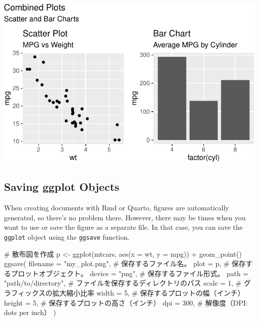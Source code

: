 \documentclass[
  a4paper,
]{book}
\newenvironment{Shaded}{\begin{snugshade}}{\end{snugshade}}
\newcommand{\AttributeTok}[1]{\textcolor[rgb]{0.40,0.45,0.13}{#1}}
\newcommand{\CommentTok}[1]{\textcolor[rgb]{0.37,0.37,0.37}{#1}}
\newcommand{\DecValTok}[1]{\textcolor[rgb]{0.68,0.00,0.00}{#1}}
\newcommand{\FunctionTok}[1]{\textcolor[rgb]{0.28,0.35,0.67}{#1}}
\newcommand{\NormalTok}[1]{\textcolor[rgb]{0.00,0.23,0.31}{#1}}
\newcommand{\OtherTok}[1]{\textcolor[rgb]{0.00,0.23,0.31}{#1}}
\newcommand{\SpecialCharTok}[1]{\textcolor[rgb]{0.37,0.37,0.37}{#1}}
\newcommand{\StringTok}[1]{\textcolor[rgb]{0.13,0.47,0.30}{#1}}
\begin{document}
\includegraphics{chapter04_files/figure-pdf/patchwork example-1.pdf}

\subsection{Saving ggplot Objects}\label{saving-ggplot-objects}

When creating documents with Rmd or Quarto, figures are automatically
generated, so there's no problem there. However, there may be times when
you want to use or save the figure as a separate file. In that case, you
can save the \texttt{ggplot} object using the \texttt{ggsave} function.

\begin{Shaded}
\begin{Highlighting}[]
\CommentTok{\# 散布図を作成}
\NormalTok{p }\OtherTok{\textless{}{-}} \FunctionTok{ggplot}\NormalTok{(mtcars, }\FunctionTok{aes}\NormalTok{(}\AttributeTok{x =}\NormalTok{ wt, }\AttributeTok{y =}\NormalTok{ mpg)) }\SpecialCharTok{+}
  \FunctionTok{geom\_point}\NormalTok{()}
\FunctionTok{ggsave}\NormalTok{(}
  \AttributeTok{filename =} \StringTok{"my\_plot.png"}\NormalTok{, }\CommentTok{\# 保存するファイル名。}
  \AttributeTok{plot =}\NormalTok{ p, }\CommentTok{\# 保存するプロットオブジェクト。}
  \AttributeTok{device =} \StringTok{"png"}\NormalTok{, }\CommentTok{\# 保存するファイル形式。}
  \AttributeTok{path =} \StringTok{"path/to/directory"}\NormalTok{, }\CommentTok{\# ファイルを保存するディレクトリのパス}
  \AttributeTok{scale =} \DecValTok{1}\NormalTok{, }\CommentTok{\# グラフィックスの拡大縮小比率}
  \AttributeTok{width =} \DecValTok{5}\NormalTok{, }\CommentTok{\# 保存するプロットの幅（インチ）}
  \AttributeTok{height =} \DecValTok{5}\NormalTok{, }\CommentTok{\# 保存するプロットの高さ（インチ）}
  \AttributeTok{dpi =} \DecValTok{300}\NormalTok{, }\CommentTok{\# 解像度（DPI: dots per inch）}
\NormalTok{)}
\end{Highlighting}
\end{Shaded}
\end{document}
